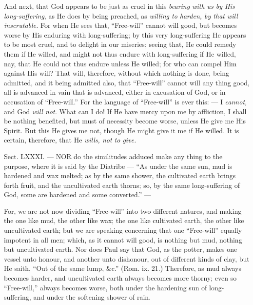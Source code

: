 And next, that God appears to be just as cruel in this \emph{bearing with us by His long-suffering}, as He does by being preached, as \emph{willing to harden, by that will inscrutable. }For when He sees that, “Free-will” cannot will good, but becomes worse by His enduring with long-suffering; by this very long-suffering He appears to be most cruel, and to delight in our miseries; seeing that, He could remedy them if He willed, and might not thus endure with long-suffering if He willed, nay, that He could not thus endure unless He willed; for who can compel Him against His will? That will, therefore, without which nothing is done, being admitted, and it being admitted also, that “Free-will” cannot will any thing good, all is advanced in vain that is advanced, either in excusation of God, or in accusation of “Free-will.” For the language of “Free-will” is ever this: — I \emph{cannot, }and God \emph{will not. }What can I do! If He have mercy upon me by affliction, I shall be nothing benefited, but must of necessity become worse, unless He give me His Spirit. But this He gives me not, though He might give it me if He willed. It is certain, therefore, that He \emph{wills, not to give.}


Sect. LXXXI. — NOR do the similitudes adduced make any thing to the purpose, where it is said by the Diatribe — “As under the same sun, mud is hardened and wax melted; as by the same shower, the cultivated earth brings forth fruit, and the uncultivated earth thorns; so, by the same long-suffering of God, some are hardened and some converted.” —

For, we are not now dividing “Free-will” into two different natures, and making the one like mud, the other like wax; the one like cultivated earth, the other like uncultivated earth; but we are speaking concerning that one “Free-will” equally impotent in all men; which, as it cannot will good, is nothing but mud, nothing but uncultivated earth. Nor does Paul say that God, as the potter, makes one vessel unto honour, and another unto dishonour, out of different kinds of clay, but He saith, “Out of the same lump, \&c.” (Rom. ix. 21.) Therefore, as mud always becomes harder, and uncultivated earth always becomes more thorny; even so “Free-will,” always becomes worse, both under the hardening sun of long-suffering, and under the softening shower of rain.

